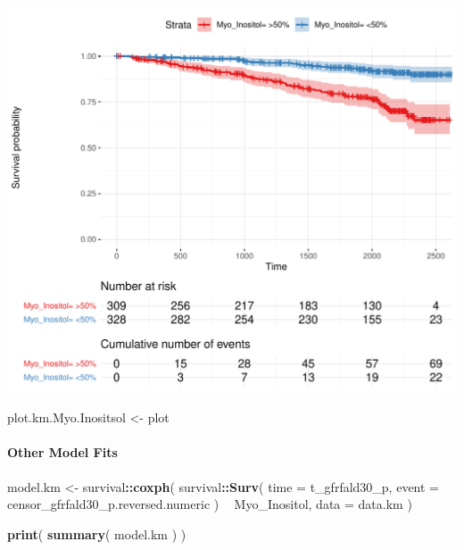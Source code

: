 \documentclass[]{article}
\newenvironment{Shaded}{\begin{snugshade}}{\end{snugshade}}
\newcommand{\DataTypeTok}[1]{\textcolor[rgb]{0.13,0.29,0.53}{#1}}
\newcommand{\KeywordTok}[1]{\textcolor[rgb]{0.13,0.29,0.53}{\textbf{#1}}}
\newcommand{\NormalTok}[1]{#1}
\newcommand{\OperatorTok}[1]{\textcolor[rgb]{0.81,0.36,0.00}{\textbf{#1}}}
\newcommand{\StringTok}[1]{\textcolor[rgb]{0.31,0.60,0.02}{#1}}
\let\oldparagraph\paragraph
\renewcommand{\paragraph}[1]{\oldparagraph{#1}\mbox{}}
\begin{document}
\includegraphics{0033_PROFIL--Metabolomics_files/figure-latex/Myo-I-Mortality-Kaplan-Maier-1.pdf}

\begin{Shaded}
\begin{Highlighting}[]
\NormalTok{plot.km.Myo.Inositsol <-}\StringTok{ }\NormalTok{plot}
\end{Highlighting}
\end{Shaded}

\newpage

\hypertarget{other-model-fits}{%
\paragraph{Other Model Fits}\label{other-model-fits}}

\begin{Shaded}
\begin{Highlighting}[]
\NormalTok{model.km <-}\StringTok{ }
\StringTok{  }\NormalTok{survival}\OperatorTok{::}\KeywordTok{coxph}\NormalTok{(}
\NormalTok{    survival}\OperatorTok{::}\KeywordTok{Surv}\NormalTok{(}
      \DataTypeTok{time =}\NormalTok{ t_gfrfald30_p, }
      \DataTypeTok{event =}\NormalTok{ censor_gfrfald30_p.reversed.numeric}
\NormalTok{    ) }
    \OperatorTok{~}\StringTok{ }
\StringTok{      }\NormalTok{Myo_Inositol, }
    \DataTypeTok{data =}\NormalTok{ data.km}
\NormalTok{  )}

\KeywordTok{print}\NormalTok{( }\KeywordTok{summary}\NormalTok{( model.km ) )}
\end{Highlighting}
\end{Shaded}
\end{document}
